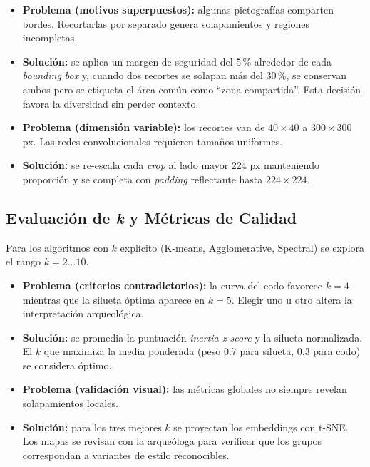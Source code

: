 \begin{itemize}
  \item \textbf{Problema (motivos superpuestos):} algunas pictografías comparten bordes.
  Recortarlas por separado genera solapamientos y regiones incompletas.
  \item \textbf{Solución:} se aplica un margen de seguridad del 5\,\% alrededor de cada \emph{bounding box} y, cuando dos recortes se solapan más del 30\,\%, se conservan ambos pero se etiqueta el área común como “zona compartida”.
  Esta decisión favora la diversidad sin perder contexto.
  \item \textbf{Problema (dimensión variable):} los recortes van de \(40\times40\) a \(300\times300\) px.
  Las redes convolucionales requieren tamaños uniformes.
  \item \textbf{Solución:} se re-escala cada \emph{crop} al lado mayor 224 px manteniendo proporción y se completa con \textit{padding} reflectante hasta \(224\times224\).
\end{itemize}

\subsection{Evaluación de \emph{k} y Métricas de Calidad}\label{ssec:k_selection}

Para los algoritmos con \(k\) explícito (K-means, Agglomerative, Spectral) se explora el rango \(k=2\ldots10\).

\begin{itemize}
  \item \textbf{Problema (criterios contradictorios):} la curva del codo favorece \(k=4\) mientras que la silueta óptima aparece en \(k=5\).
  Elegir uno u otro altera la interpretación arqueológica.
  \item \textbf{Solución:} se promedia la puntuación \emph{inertia z-score} y la silueta normalizada.
  El \(k\) que maximiza la media ponderada (peso 0.7 para silueta, 0.3 para codo) se considera óptimo.

  \item \textbf{Problema (validación visual):} las métricas globales no siempre revelan solapamientos locales.
  \item \textbf{Solución:} para los tres mejores \(k\) se proyectan los embeddings con t-SNE.
  Los mapas se revisan con la arqueóloga para verificar que los grupos correspondan a variantes de estilo reconocibles.
\end{itemize}


